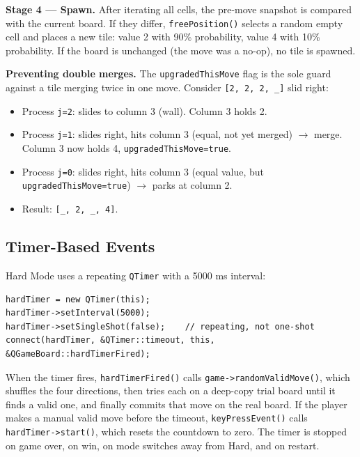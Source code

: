 \documentclass[a4paper,12pt]{article}
\begin{document}
\textbf{Stage 4 --- Spawn.} After iterating all cells, the pre-move snapshot is compared with the current board. If they differ, \texttt{freePosition()} selects a random empty cell and places a new tile: value 2 with 90\% probability, value 4 with 10\% probability. If the board is unchanged (the move was a no-op), no tile is spawned.

\textbf{Preventing double merges.} The \texttt{upgradedThisMove} flag is the sole guard against a tile merging twice in one move. Consider \texttt{[2, 2, 2, \_]} slid right:
\begin{itemize}
    \item Process \texttt{j=2}: slides to column 3 (wall). Column 3 holds 2.
    \item Process \texttt{j=1}: slides right, hits column 3 (equal, not yet merged) $\rightarrow$ merge. Column 3 now holds 4, \texttt{upgradedThisMove=true}.
    \item Process \texttt{j=0}: slides right, hits column 3 (equal value, but \texttt{upgradedThisMove=true}) $\rightarrow$ parks at column 2.
    \item Result: \texttt{[\_, 2, \_, 4]}.
\end{itemize}

\subsection{Timer-Based Events}

Hard Mode uses a repeating \texttt{QTimer} with a 5000 ms interval:

\begin{lstlisting}[style=CppStyle, caption={Hard-mode timer initialisation}]
hardTimer = new QTimer(this);
hardTimer->setInterval(5000);
hardTimer->setSingleShot(false);    // repeating, not one-shot
connect(hardTimer, &QTimer::timeout, this, &QGameBoard::hardTimerFired);
\end{lstlisting}

When the timer fires, \texttt{hardTimerFired()} calls \texttt{game->randomValidMove()}, which shuffles the four directions, then tries each on a deep-copy trial board until it finds a valid one, and finally commits that move on the real board. If the player makes a manual valid move before the timeout, \texttt{keyPressEvent()} calls \texttt{hardTimer->start()}, which resets the countdown to zero. The timer is stopped on game over, on win, on mode switches away from Hard, and on restart.

\end{document}
